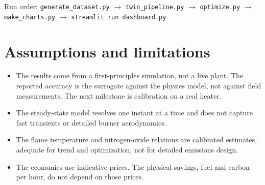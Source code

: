 \documentclass[11pt,a4paper]{article}
\begin{document}
Run order:
\texttt{generate\_dataset.py} $\rightarrow$ \texttt{twin\_pipeline.py} $\rightarrow$
\texttt{optimize.py} $\rightarrow$ \texttt{make\_charts.py} $\rightarrow$
\texttt{streamlit run dashboard.py}.

\section{Assumptions and limitations}

\begin{itemize}[leftmargin=1.4em]
  \item The results come from a first-principles simulation, not a live plant. The
        reported accuracy is the surrogate against the physics model, not against
        field measurements. The next milestone is calibration on a real heater.
  \item The steady-state model resolves one instant at a time and does not capture
        fast transients or detailed burner aerodynamics.
  \item The flame temperature and nitrogen-oxide relations are calibrated
        estimates, adequate for trend and optimization, not for detailed emissions
        design.
  \item The economics use indicative prices. The physical savings, fuel and carbon
        per hour, do not depend on those prices.
\end{itemize}
\end{document}
